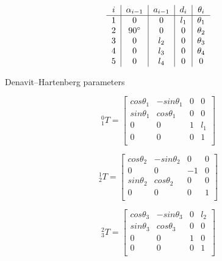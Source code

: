 \documentclass[transmag]{IEEEtran}
\begin{document}
\begin{eqfloat}
\begin{equation}
\begin{tabular}{c|c|c|c|c}
$i$  & $\alpha_{i-1}$ & $a_{i-1}$ & $d_i$        & $\theta_i$ \\
\hline
1    &  0             &  0         &  $l_1$ & $\theta_1$ \\
2    &  $90^{\circ}$        &  0         &  0     & $\theta_2$ \\
3    &  0             &  $l_2$     &  0     & $\theta_3$ \\
4    &  0             &  $l_3$     &  0     & $\theta_4$ \\
5    &  0             &  $l_4$     &  0     & 0 \\
\end{tabular}
\end{equation}

\begin{center}
Denavit–Hartenberg parameters
\end{center}




\begin{equation}
^0_1T =
\begin{bmatrix}
cos\theta_1 & -sin\theta_1 & 0 & 0   \\
sin\theta_1 & cos\theta_1  & 0 & 0   \\
0           & 0            & 1 & l_1 \\
0           & 0            & 0 & 1   \\
\end{bmatrix}
\end{equation}


\begin{equation}
^1_2T =
\begin{bmatrix}
cos\theta_2 & -sin\theta_2 & 0      & 0   \\
0           & 0            & -1     & 0   \\
sin\theta_2 & cos\theta_2  & 0      & 0   \\
0           & 0            & 0      & 1   \\
\end{bmatrix}
\end{equation}




\begin{equation}
^2_3T =
\begin{bmatrix}
cos\theta_3 & -sin\theta_3 & 0      & l_2 \\
sin\theta_3 & cos\theta_3  & 0      & 0   \\
0           & 0            & 1      & 0   \\
0           & 0            & 0      & 1   \\
\end{bmatrix}
\end{equation}




\end{eqfloat}
\end{document}
